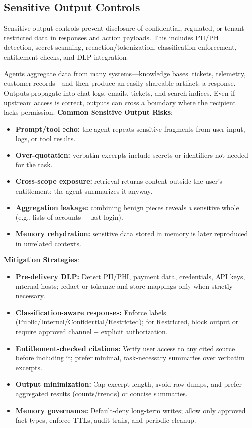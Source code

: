 \begin{TNtwocol}
    \section{Sensitive Output Controls}

    Sensitive output controls prevent disclosure of confidential, regulated, or tenant-restricted data in responses and action payloads. This includes PII/PHI detection, secret scanning, redaction/tokenization, classification enforcement, entitlement checks, and DLP integration.

    Agents aggregate data from many systems—knowledge bases, tickets, telemetry, customer records—and then produce an easily shareable artifact: a response. Outputs propagate into chat logs, emails, tickets, and search indices. Even if upstream access is correct, outputs can cross a boundary where the recipient lacks permission.
    \textbf{Common Sensitive Output Risks}:
    \begin{itemize}
        \item \textbf{Prompt/tool echo:} the agent repeats sensitive fragments from user input, logs, or tool results.
        \item \textbf{Over-quotation:} verbatim excerpts include secrets or identifiers not needed for the task.
        \item \textbf{Cross-scope exposure:} retrieval returns content outside the user’s entitlement; the agent summarizes it anyway.
        \item \textbf{Aggregation leakage:} combining benign pieces reveals a sensitive whole (e.g., lists of accounts + last login).
        \item \textbf{Memory rehydration:} sensitive data stored in memory is later reproduced in unrelated contexts.
    \end{itemize}

    \textbf{Mitigation Strategies}:
    \begin{itemize}
        \item \textbf{Pre-delivery DLP:} Detect PII/PHI, payment data, credentials, API keys, internal hosts; redact or tokenize and store mappings only when strictly necessary.
        \item \textbf{Classification-aware responses:} Enforce labels (Public/Internal/Confidential/Restricted); for Restricted, block output or require approved channel + explicit authorization.
        \item \textbf{Entitlement-checked citations:} Verify user access to any cited source before including it; prefer minimal, task-necessary summaries over verbatim excerpts.
        \item \textbf{Output minimization:} Cap excerpt length, avoid raw dumps, and prefer aggregated results (counts/trends) or concise summaries.
        \item \textbf{Memory governance:} Default-deny long-term writes; allow only approved fact types, enforce TTLs, audit trails, and periodic cleanup.
    \end{itemize}


\end{TNtwocol}
